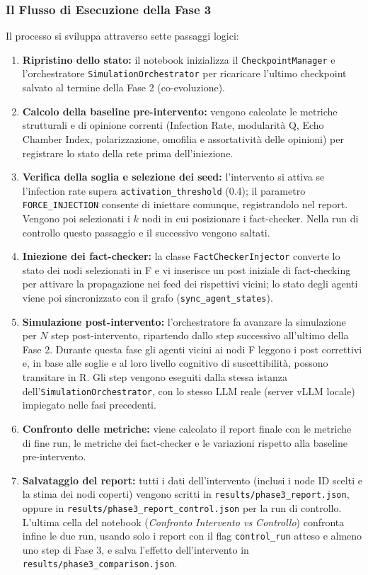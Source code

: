 \documentclass[11pt, a4paper]{article}
\begin{document}
\subsubsection{Il Flusso di Esecuzione della Fase 3}
Il processo si sviluppa attraverso sette passaggi logici:
\begin{enumerate}
    \item \textbf{Ripristino dello stato:} il notebook inizializza il \texttt{CheckpointManager} e l'orchestratore \texttt{SimulationOrchestrator} per ricaricare l'ultimo checkpoint salvato al termine della Fase 2 (co-evoluzione).
    \item \textbf{Calcolo della baseline pre-intervento:} vengono calcolate le metriche strutturali e di opinione correnti (Infection Rate, modularità Q, Echo Chamber Index, polarizzazione, omofilia e assortatività delle opinioni) per registrare lo stato della rete prima dell'iniezione.
    \item \textbf{Verifica della soglia e selezione dei seed:} l'intervento si attiva se l'infection rate supera \texttt{activation\_threshold} (0.4); il parametro \texttt{FORCE\_INJECTION} consente di iniettare comunque, registrandolo nel report. Vengono poi selezionati i $k$ nodi in cui posizionare i fact-checker. Nella run di controllo questo passaggio e il successivo vengono saltati.
    \item \textbf{Iniezione dei fact-checker:} la classe \texttt{FactCheckerInjector} converte lo stato dei nodi selezionati in F e vi inserisce un post iniziale di fact-checking per attivare la propagazione nei feed dei rispettivi vicini; lo stato degli agenti viene poi sincronizzato con il grafo (\texttt{sync\_agent\_states}).
    \item \textbf{Simulazione post-intervento:} l'orchestratore fa avanzare la simulazione per $N$ step post-intervento, ripartendo dallo step successivo all'ultimo della Fase 2. Durante questa fase gli agenti vicini ai nodi F leggono i post correttivi e, in base alle soglie e al loro livello cognitivo di suscettibilità, possono transitare in R. Gli step vengono eseguiti dalla stessa istanza dell'\texttt{SimulationOrchestrator}, con lo stesso LLM reale (server vLLM locale) impiegato nelle fasi precedenti.
    \item \textbf{Confronto delle metriche:} viene calcolato il report finale con le metriche di fine run, le metriche dei fact-checker e le variazioni rispetto alla baseline pre-intervento.
    \item \textbf{Salvataggio del report:} tutti i dati dell'intervento (inclusi i node ID scelti e la stima dei nodi coperti) vengono scritti in \texttt{results/phase3\_report.json}, oppure in \texttt{results/}\allowbreak\texttt{phase3\_report\_control.json} per la run di controllo. L'ultima cella del notebook (\textit{Confronto Intervento vs Controllo}) confronta infine le due run, usando solo i report con il flag \texttt{control\_run} atteso e almeno uno step di Fase 3, e salva l'effetto dell'intervento in \texttt{results/phase3\_comparison.json}.
\end{enumerate}
\end{document}
